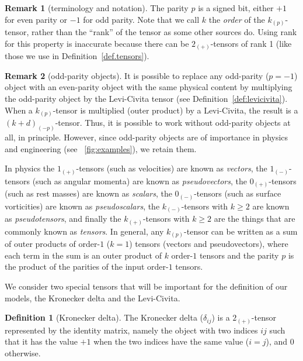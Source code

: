 \documentclass{article}
\theoremstyle{definition}
\newtheorem{definition}{Definition}
\newtheorem*{remark}{Remark}
\newcommand{\tensorname}[2]{{#1}_{(#2)}}
\newcommand{\tensor}[2]{$\tensorname{#1}{#2}$-tensor}
\begin{document}
\begin{remark}[terminology and notation]
The parity $p$ is a signed bit, either $+1$ for even parity or $-1$ for odd parity.
Note that we call $k$ the \emph{order} of the \tensor{k}{p}, rather than the ``rank'' of the tensor as some other sources do. Using rank for this property is inaccurate because there can be \tensor{2}{+}s of rank 1 (like those we use in Definition~\ref{def.tensors}).
\end{remark}

\begin{remark}[odd-parity objects]
It is possible to replace any odd-parity ($p=-1$) object with an even-parity object with the same physical content by multiplying the odd-parity object by the Levi-Civita tensor (see Definition~\ref{def:levicivita}).
When a \tensor{k}{p} is multiplied (outer product) by a Levi-Civita, the result is a \tensor{(k+d)}{-p}.
Thus, it is possible to work without odd-parity objects at all, in principle.
However, since odd-parity objects are of importance in physics and engineering (see \figurename~\ref{fig:examples}), we retain them.
\end{remark}

In physics the \tensor{1}{+}s (such as velocities) are known as \emph{vectors},
the \tensor{1}{-}s (such as angular momenta) are known as \emph{pseudovectors},
the \tensor{0}{+}s (such as rest masses) are known as \emph{scalars},
the \tensor{0}{-}s (such as surface vorticities) are known as \emph{pseudoscalars},
the \tensor{k}{-}s with $k\geq 2$ are known as \emph{pseudotensors},
and finally the \tensor{k}{+}s with $k\geq 2$ are the things that are commonly known as \emph{tensors}.
In general, any \tensor{k}{p} can be written as a sum of outer products of order-$1$ ($k=1$) tensors (vectors and pseudovectors), where each term in the sum is an outer product of $k$ order-$1$ tensors and the parity $p$ is the product of the parities of the input order-$1$ tensors.

We consider two special tensors that will be important for the definition of our models, the Kronecker delta and the Levi-Civita.

\begin{definition}[Kronecker delta] The Kronecker delta ($\delta_{ij}$) is a \tensor{2}{+} represented by the identity matrix, namely the object with two indices $ij$ such that it has the value $+1$ when the two indices have the same value ($i=j$), and $0$ otherwise.
\end{definition}
\end{document}

